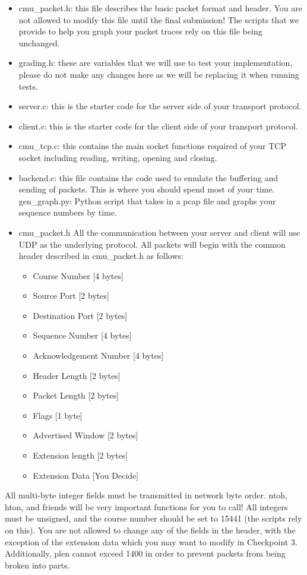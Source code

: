 \begin{itemize}
\item cmu\_packet.h: this file describes the basic packet format and header. You are not allowed to modify this file until the final submission! The scripts that we provide to help you graph your packet traces rely on this file being unchanged.
\item grading.h: these are variables that we will use to test your implementation, please do not make any changes here as we will be replacing it when running tests. 
\item server.c:  this is the starter code for the server side of your transport protocol. 
\item client.c: this is the starter code for the client side of your transport protocol.
\item cmu\_tcp.c: this contains the main socket functions required of your TCP socket including reading, writing, opening and closing. 
\item backend.c: this file contains the code used to emulate the buffering and sending of packets. This is where you should spend most of your time.
gen\_graph.py: Python script that takes in a pcap file and graphs your sequence numbers by time. 
\item cmu\_packet.h
All the communication between your server and client will use UDP as the underlying protocol. All packets will begin with the common header described in cmu\_packet.h as follows:
\begin{itemize}
    \item Course Number 		[4 bytes]
    \item Source Port 			[2 bytes]
    \item Destination Port 		[2 bytes]
    \item Sequence Number 		[4 bytes]
    \item Acknowledgement Number 	[4 bytes]
    \item Header Length		[2 bytes]
    \item Packet Length			[2 bytes]
    \item Flags				[1 byte]
    \item Advertised Window		[2 bytes]
    \item Extension length		[2 bytes]
    \item Extension Data		[You Decide]
\end{itemize}
\end{itemize}

All multi-byte integer fields must be transmitted in network byte order. ntoh, hton, and friends will be very important functions for you to call! All integers must be unsigned, and the course number should be set to 15441 (the scripts rely on this). You are not allowed to change any of the fields in the header, with the exception of the extension data which you may want to modify in Checkpoint 3. Additionally, plen cannot exceed 1400 in order to prevent packets from being broken into parts.

